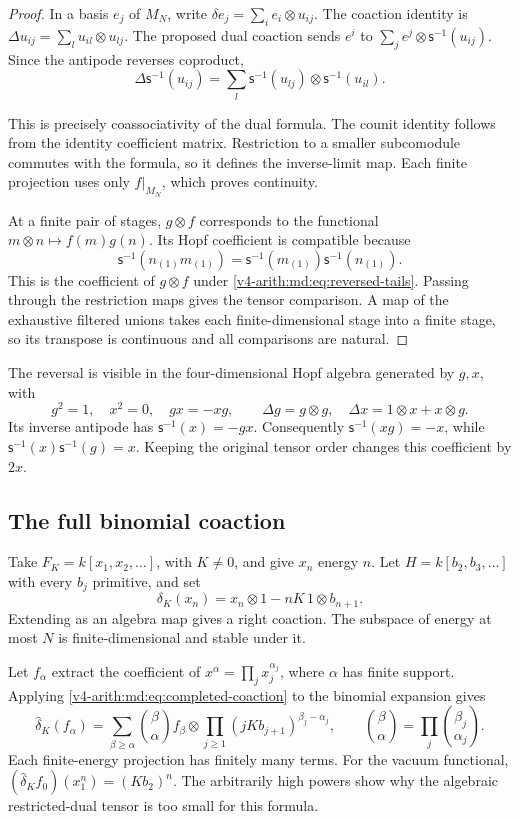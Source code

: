 \begin{proof}
In a basis $e_j$ of $M_N$, write
$\delta e_j=\sum_i e_i\otimes u_{ij}$. The coaction identity
is $\Delta u_{ij}=\sum_lu_{il}\otimes u_{lj}$.
The proposed dual coaction sends
$e^i$ to $\sum_je^j\otimes\mathsf s^{-1}(u_{ij})$.
Since the antipode reverses coproduct,
\[
 \Delta\mathsf s^{-1}(u_{ij})
 =\sum_l\mathsf s^{-1}(u_{lj})\otimes\mathsf s^{-1}(u_{il}).
\]

This is precisely coassociativity of the dual formula.
The counit identity follows from the identity coefficient
matrix. Restriction to a smaller subcomodule commutes with
the formula, so it defines the inverse-limit map. Each
finite projection uses only $f|_{M_N}$, which proves continuity.

At a finite pair of stages, $g\otimes f$ corresponds to the
functional $m\otimes n\mapsto f(m)g(n)$. Its Hopf coefficient
is compatible because
\[
 \mathsf s^{-1}(n_{(1)}m_{(1)})
 =\mathsf s^{-1}(m_{(1)})\mathsf s^{-1}(n_{(1)}).
\]
This is the coefficient of $g\otimes f$ under
\eqref{v4-arith:md:eq:reversed-tails}. Passing through the
restriction maps gives the tensor comparison. A map of the
exhaustive filtered unions takes each finite-dimensional
stage into a finite stage, so its transpose is continuous
and all comparisons are natural.
\end{proof}

The reversal is visible in the four-dimensional Hopf algebra
generated by $g,x$, with
\[
 g^2=1,\quad x^2=0,\quad gx=-xg,
 \qquad\Delta g=g\otimes g,\quad
 \Delta x=1\otimes x+x\otimes g.
\]
Its inverse antipode has $\mathsf s^{-1}(x)=-gx$.
Consequently $\mathsf s^{-1}(xg)=-x$, while
$\mathsf s^{-1}(x)\mathsf s^{-1}(g)=x$.
Keeping the original tensor order changes this coefficient
by $2x$.

\subsection{The full binomial coaction}

Take $F_K=k[x_1,x_2,\ldots]$, with $K\ne0$, and give $x_n$
energy $n$. Let $H=k[b_2,b_3,\ldots]$ with every $b_j$
primitive, and set
\[
 \delta_K(x_n)=x_n\otimes1-nK\,1\otimes b_{n+1}.
\]
Extending as an algebra map gives a right coaction. The
subspace of energy at most $N$ is finite-dimensional and
stable under it.

Let $f_\alpha$ extract the coefficient of
$x^\alpha=\prod_jx_j^{\alpha_j}$, where $\alpha$ has finite
support. Applying \eqref{v4-arith:md:eq:completed-coaction}
to the binomial expansion gives
\begin{equation}\label{v4-arith:md:eq:fock-coaction}
 \widehat\delta_K(f_\alpha)
 =\sum_{\beta\geq\alpha}\binom\beta\alpha f_\beta\otimes
       \prod_{j\geq1}(jKb_{j+1})^{\beta_j-\alpha_j},
 \qquad \binom\beta\alpha=\prod_j\binom{\beta_j}{\alpha_j}.
\end{equation}
Each finite-energy projection has finitely many terms.
For the vacuum functional,
$(\widehat\delta_Kf_0)(x_1^n)=(Kb_2)^n$.
The arbitrarily high powers show why the algebraic
restricted-dual tensor is too small for this formula.

